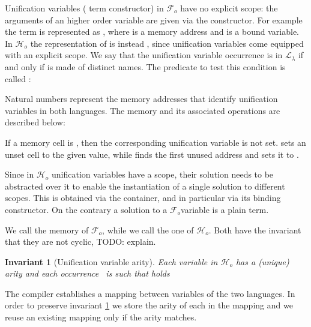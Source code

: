 \documentclass[sigconf,natbib=false,review]{acmart}
\newtheorem{invariant}{Invariant}
\newcommand{\llambda}{\ensuremath{\mathcal{L}_\lambda}\xspace}
\newcommand{\Fo}{\ensuremath{\mathcal{F}_{\!o}\xspace}} %
\newcommand{\Ho}{\ensuremath{\mathcal{H}_o}\xspace}
\begin{document}
\noindent
Unification variables ( term constructor)
in \Fo{} have no explicit scope:
the arguments of an higher order variable are given via the 
constructor. For example the term  is represented as
, where  is a memory address and
 is a bound variable.\\
In \Ho the representation of  is instead ,
since unification variables come equipped with an explicit scope.
We say that the unification variable occurrence  is in
\llambda if and only if  is made of distinct names. The
predicate to test this condition is called :



\noindent
Natural numbers represent the memory addresses that
identify unification variables in both languages.
The memory and its associated operations are described below:



\noindent
If a memory cell is , then the corresponding unification variable
is not set.  sets an unset cell to the given value, while
 finds the first unused address and sets it to .

Since in \Ho unification variables have a scope, their solution needs to be
abstracted over it to enable the instantiation of a single
solution to different scopes. This is obtained via the 
container, and in particular via its  binding constructor.
On the contrary a solution to a \Fo variable is a plain term.




\noindent
We call  the memory of \Fo{}, while we call 
the one of \Ho.
Both have the invariant that they are not cyclic, TODO: explain.



\begin{invariant}[Unification variable arity]
  Each variable 
  in \Ho has a (unique) arity  and each occurrence~
   is such that  holds
  \label{inv:uvaarity}
\end{invariant}

\noindent
The compiler establishes a mapping between variables of the two languages.
In order to preserve invariant \ref{inv:uvaarity} we store the
arity of each  in the mapping and we reuse an existing
mapping only if the arity matches.
\end{document}
